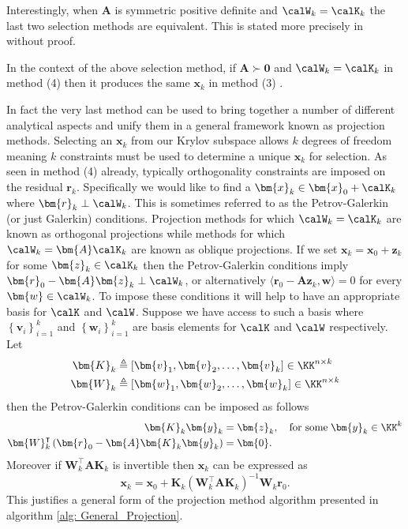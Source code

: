 Interestingly, when $\bm{A}$ is symmetric positive definite and $\calW_k = \calK_k$ the last two selection methods are equivalent. This is stated more precisely in  without proof.

\begin{thm} \label{theorem: 3_4_method_eq}
    In the context of the above selection method, if $\bm{A} \succ \bm{0}$ and $\calW_k = \calK_k$ in method (4) then it produces the same $\bm{x}_k$ in method (3) \cite{DemmelJamesW1997Anla}.
\end{thm}

In fact the very last method can be used to bring together a number of different analytical aspects and unify them in a general framework known as projection methods. Selecting an $\bm{x}_k$ from our Krylov subspace allows $k$ degrees of freedom meaning $k$ constraints must be used to determine a unique $\bm{x}_k$ for selection. As seen in method (4) already, typically orthogonality constraints are imposed on the residual $\bm{r}_k$. Specifically we would like to find a $\bm{x}_k \in \bm{x}_0 + \calK_k$ where $\bm{r}_k \perp \calW_k$. This is sometimes referred to as the Petrov-Galerkin (or just Galerkin) conditions. Projection methods for which $\calW_k = \calK_k$ are known as orthogonal projections while methods for which $\calW_k = \bm{A} \calK_k$ are known as oblique projections. If we set $\bm{x}_k = \bm{x}_0 + \bm{z}_k$ for some $\bm{z}_k \in \calK_k$ then the Petrov-Galerkin conditions imply $\bm{r}_0 - \bm{A} \bm{z}_k \perp \calW_k$, or alternatively $\langle \bm{r}_0 - \bm{A} \bm{z}_k , \bm{w} \rangle = 0$ for every $\bm{w} \in \calW_k$. To impose these conditions it will help to have an appropriate basis for $\calK$ and $\calW$. Suppose we have access to such a basis where $\left\{ \bm{v}_i \right\}_{i=1}^{k}$ and $\left\{ \bm{w}_i \right\}_{i=1}^{k}$ are basis elements for $\calK$ and $\calW$ respectively. Let
\begin{align*}
    \bm{K}_k & \triangleq \left[ \bm{v}_1 , \bm{v}_2 , \ldots , \bm{v}_k \right] \in \KK^{n \times k} \\
    \bm{W}_k & \triangleq \left[ \bm{w}_1 , \bm{w}_2 , \ldots , \bm{w}_k \right] \in \KK^{n \times k}
\end{align*}
then the Petrov-Galerkin conditions can be imposed as follows
\begin{align*}
    \bm{K}_k \bm{y}_k                                                       & = \bm{z}_k , \quad \text{for some} \; \bm{y}_k \in \KK^k \\
    \bm{W}_k^{\intercal} \left( \bm{r}_0 - \bm{A} \bm{K}_k \bm{y}_k \right) & = \bm{0}.
\end{align*}
Moreover if $\bm{W}_k^{\intercal} \bm{A} \bm{K}_k$ is invertible then $\bm{x}_k$ can be expressed as
\begin{equation} \label{eq: expr_x_Petrov_Galerkin_1}
    \bm{x}_k = \bm{x}_0 + \bm{K}_k \left( \bm{W}_k^{\intercal} \bm{A} \bm{K}_k \right)^{-1} \bm{W}_k \bm{r}_0.
\end{equation}
This justifies a general form of the projection method algorithm presented in algorithm \ref{alg: General_Projection}.

